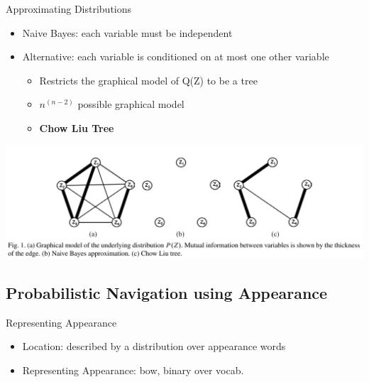 \begin{frame}{Approximating Distributions}
    \begin{itemize}
        \item Naive Bayes: each variable must be independent
        \item Alternative: each variable is conditioned on at most one other variable
            \begin{itemize}
                \item Restricts the graphical model of Q(Z) to be a tree
                \item $n^{(n-2)}$ possible graphical model
                \item \textbf{Chow Liu Tree}
            \end{itemize}
    \end{itemize}
    \includegraphics[width=1.0\textwidth]{./media/chow_liu_tree.png}

\end{frame}

\subsection{Probabilistic Navigation using Appearance}
\begin{frame}{Representing Appearance}
    \begin{itemize}
        \item Location: described by a distribution over appearance words
        \item Representing Appearance: bow, binary over vocab.
    \end{itemize}
\end{frame}

